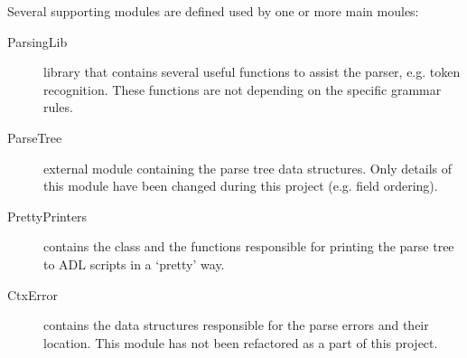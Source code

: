   Several supporting modules are defined used by one or more main moules:
  \begin{description}
    \item[ParsingLib] library that contains several useful functions to assist the parser, e.g. token recognition.
      These functions are not depending on the specific grammar rules.
      
    \item[ParseTree] external module containing the parse tree data structures.
      Only details of this module have been changed during this project (e.g. field ordering).
    
    \item[PrettyPrinters] contains the  class and the functions responsible for printing the parse tree to ADL scripts in a `pretty' way.
    
    \item[CtxError] contains the data structures responsible for the parse errors and their location.
      This module has not been refactored as a part of this project.
    
  \end{description}
